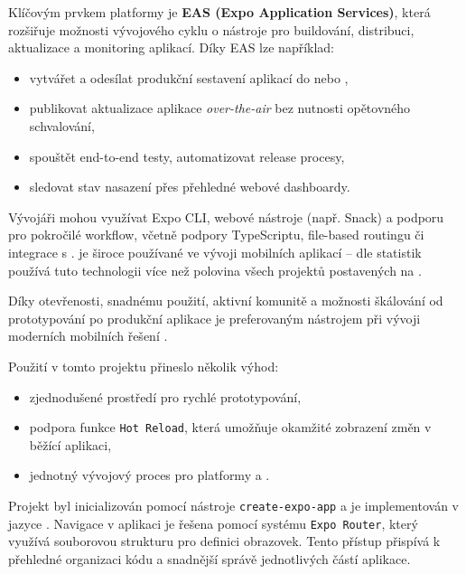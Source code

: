 \documentclass[czech, bp, kiv, he, iso690numb, pdf]{fasthesis}
\begin{document}
    Klíčovým prvkem platformy je \textbf{EAS (Expo Application Services)}, která rozšiřuje možnosti vývojového cyklu o nástroje pro buildování, distribuci, aktualizace a monitoring aplikací. Díky EAS lze například:

    \begin{itemize}
        \item vytvářet a odesílat produkční sestavení aplikací do  nebo ,
        \item publikovat aktualizace aplikace \textit{over-the-air} bez nutnosti opětovného schvalování,
        \item spouštět end-to-end testy, automatizovat release procesy,
        \item sledovat stav nasazení přes přehledné webové dashboardy.
    \end{itemize}

    Vývojáři mohou využívat Expo CLI, webové nástroje (např. Snack) a podporu pro pokročilé workflow, včetně podpory TypeScriptu, file-based routingu či integrace s .  je široce používané ve vývoji mobilních aplikací – dle statistik používá tuto technologii více než polovina všech projektů postavených na .

    Díky otevřenosti, snadnému použití, aktivní komunitě a možnosti škálování od prototypování po produkční aplikace je  preferovaným nástrojem při vývoji moderních mobilních řešení \cite{expo2025}.


    Použití  v tomto projektu přineslo několik výhod:
    \begin{itemize}
        \item zjednodušené prostředí pro rychlé prototypování,
        \item podpora funkce \texttt{Hot Reload}, která umožňuje okamžité zobrazení změn v běžící aplikaci,
        \item jednotný vývojový proces pro platformy  a .
    \end{itemize}

    Projekt byl inicializován pomocí nástroje \texttt{create-expo-app} a je implementován v jazyce . Navigace v aplikaci je řešena pomocí systému \texttt{Expo Router}, který využívá souborovou strukturu pro definici obrazovek. Tento přístup přispívá k přehledné organizaci kódu a snadnější správě jednotlivých částí aplikace.
\end{document}

